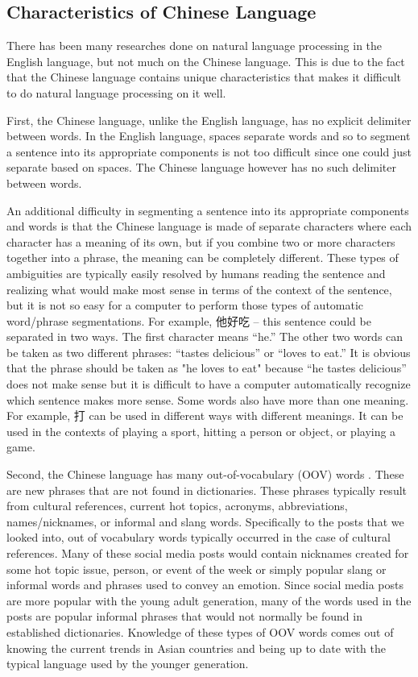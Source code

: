 \documentclass[11pt]{article}
\newcommand{\1}[1]{{\mathbf 1}\left\{#1\right\}}        %
\begin{document}
\subsection{Characteristics of Chinese Language}\label{subsubsec:Chinese}

There has been  many researches done on natural language processing in the English language, but not much on the Chinese language.  This is due to the fact that the Chinese language contains unique characteristics that makes it difficult to do natural language processing on it well. 
 
First, the Chinese language, unlike the English language, has no explicit delimiter between words. In the English language, spaces separate words and so to segment a sentence into its appropriate components is not too difficult since one could just separate based on spaces.  The Chinese language however has no such delimiter between words.
 
An additional difficulty in segmenting a sentence into its appropriate components and words is that the Chinese language is made of separate characters where each character has a meaning of its own, but if you combine two or more characters together into a phrase, the meaning can be completely different. These types of ambiguities are typically easily resolved by humans reading the sentence and realizing what would make most sense in terms of the context of the
sentence, but it is not so easy for a computer to perform those types of automatic word/phrase segmentations. For example, 他好吃 -- this sentence could be separated in two ways. The first character means ``he.'' The other two words can be taken as two different phrases: ``tastes delicious'' or ``loves to eat.''  It is obvious that the phrase should be taken as "he loves to eat" because ``he tastes delicious'' does not make sense but it is difficult to have a computer
automatically recognize which sentence makes more sense. Some words also have more than one meaning. For example, 打 can be used in different ways with different meanings. It can be used in the contexts of playing a sport, hitting a person or object, or playing a game. 

Second, the Chinese language has many out-of-vocabulary (OOV) words .  These are new phrases that are not found in dictionaries.  These phrases typically result from cultural references, current hot topics, acronyms, abbreviations, names/nicknames, or informal and slang words.  Specifically to the posts that we looked into, out of vocabulary words typically occurred in the case of cultural references.  Many of these social media posts would contain nicknames created for some hot topic issue, person, or event of the week or simply popular slang or informal words and phrases used to convey an emotion.  Since social media posts are more popular with the young adult generation, many of the words used in the posts are popular informal phrases that would not normally be found in established dictionaries. Knowledge of these types of OOV words comes out of knowing the current trends in Asian countries and being up to date with the typical language used by the younger generation.  
\end{document}
